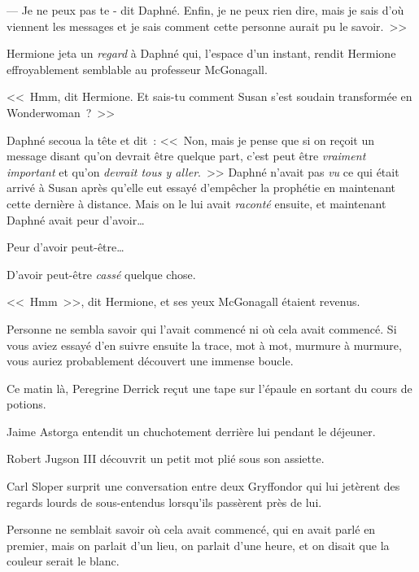 --- Je ne peux pas te - dit Daphné. Enfin, je ne peux rien dire, mais je sais d'où viennent les messages et je sais comment cette personne aurait pu le savoir.~>>

Hermione jeta un \emph{regard} à Daphné qui, l'espace d'un instant, rendit Hermione effroyablement semblable au professeur McGonagall.

<<~Hmm, dit Hermione. Et sais-tu comment Susan s'est soudain transformée en Wonderwoman~?~>>

Daphné secoua la tête et dit~: <<~Non, mais je pense que si on reçoit un message disant qu'on devrait être quelque part, c'est peut être \emph{vraiment important} et qu'on \emph{devrait tous y aller}.~>> Daphné n'avait pas \emph{vu} ce qui était arrivé à Susan après qu'elle eut essayé d'empêcher la prophétie en maintenant cette dernière à distance. Mais on le lui avait \emph{raconté} ensuite, et maintenant Daphné avait peur d'avoir…

Peur d'avoir peut-être…

D'avoir peut-être \emph{cassé} quelque chose.

<<~Hmm~>>, dit Hermione, et ses yeux McGonagall étaient revenus.

\later

Personne ne sembla savoir qui l'avait commencé ni où cela avait commencé. Si vous aviez essayé d'en suivre ensuite la trace, mot à mot, murmure à murmure, vous auriez probablement découvert une immense boucle.

Ce matin là, Peregrine Derrick reçut une tape sur l'épaule en sortant du cours de potions.

Jaime Astorga entendit un chuchotement derrière lui pendant le déjeuner.

Robert Jugson III découvrit un petit mot plié sous son assiette.

Carl Sloper surprit une conversation entre deux Gryffondor qui lui jetèrent des regards lourds de sous-entendus lorsqu'ils passèrent près de lui.

Personne ne semblait savoir où cela avait commencé, qui en avait parlé en premier, mais on parlait d'un lieu, on parlait d'une heure, et on disait que la couleur serait le blanc.

\later

